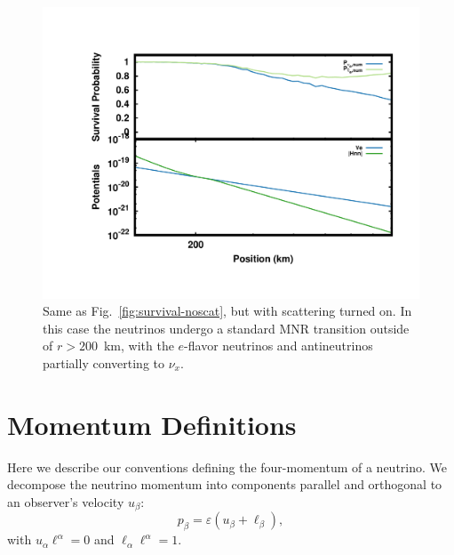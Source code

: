 \documentclass[aps,floatfix,prd,superscriptaddress,twocolumn]{revtex4-1}
\begin{document}
\begin{figure}
  \includegraphics[width=\columnwidth]{fig-survival_prob-scat_nh}
  \caption{Same as Fig.~\ref{fig:survival-noscat},
    but with scattering turned on.
    In this case the neutrinos undergo a standard MNR transition
    outside of $r>200$~km,
    with the $e$-flavor neutrinos and antineutrinos
    partially converting to $\nu_x$.
    }
  \label{fig:survival-scat}
\end{figure}


\appendix

\section{Momentum Definitions}
\label{sec:def_momentum}
Here we describe our conventions defining the four-momentum of a neutrino.
We decompose the neutrino momentum into components parallel and orthogonal to
an observer's velocity $u_\beta$:
\begin{equation}
  \label{eqn:def_momentum_2}
  p_\beta = \varepsilon (u_\beta + \ell_\beta),
\end{equation}
with $u_\alpha\ell^\alpha=0$ and $\ell_\alpha\ell^\alpha=1$.
\end{document}

